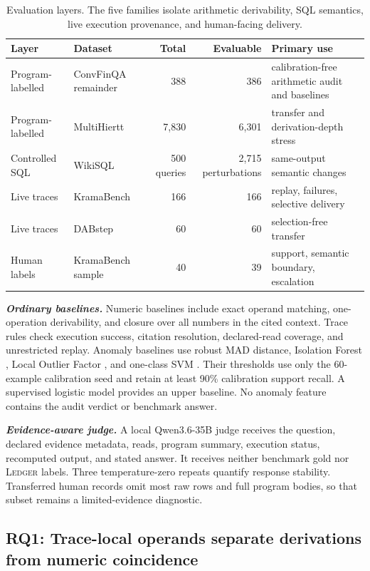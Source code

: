 \documentclass[5p,times]{elsarticle}
\newcommand{\ledger}{\textsc{Ledger}\xspace}
\newcommand{\etitle}[1]{%
  \par\vspace{0.35ex}\noindent\textbf{\textit{#1}}\hspace{0.4em}}
\begin{document}
\begin{table}[t]
\centering
\caption{Evaluation layers. The five families isolate arithmetic derivability, SQL semantics, live execution provenance, and human-facing delivery.}
\label{tab:datasets}
\small
\begin{tabular}{@{}llrrl@{}}
\toprule
Layer & Dataset & Total & Evaluable & Primary use \\
\midrule
Program-labelled & ConvFinQA remainder & 388 & 386 & calibration-free arithmetic audit and baselines \\
Program-labelled & MultiHiertt & 7,830 & 6,301 & transfer and derivation-depth stress \\
Controlled SQL & WikiSQL & 500 queries & 2,715 perturbations & same-output semantic changes \\
Live traces & KramaBench & 166 & 166 & replay, failures, selective delivery \\
Live traces & DABstep & 60 & 60 & selection-free transfer \\
Human labels & KramaBench sample & 40 & 39 & support, semantic boundary, escalation \\
\bottomrule
\end{tabular}
\end{table}

\etitle{Ordinary baselines.}
Numeric baselines include exact operand matching, one-operation derivability, and closure over all numbers in the cited context. Trace rules check execution success, citation resolution, declared-read coverage, and unrestricted replay. Anomaly baselines use robust MAD distance, Isolation Forest \citep{liu2008isolation}, Local Outlier Factor \citep{breunig2000lof}, and one-class SVM \citep{scholkopf2001support}. Their thresholds use only the 60-example calibration seed and retain at least 90\% calibration support recall. A supervised logistic model provides an upper baseline. No anomaly feature contains the audit verdict or benchmark answer.

\etitle{Evidence-aware judge.}
A local Qwen3.6-35B judge receives the question, declared evidence metadata, reads, program summary, execution status, recomputed output, and stated answer. It receives neither benchmark gold nor \ledger labels. Three temperature-zero repeats quantify response stability. Transferred human records omit most raw rows and full program bodies, so that subset remains a limited-evidence diagnostic.

\subsection{RQ1: Trace-local operands separate derivations from numeric coincidence}\label{sec:rq1}
\end{document}

